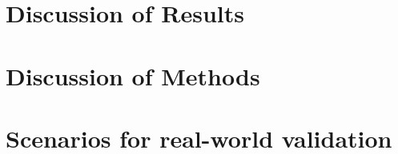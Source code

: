 \section{Discussion of Results}
\section{Discussion of Methods}
\section{Scenarios for real-world validation}

